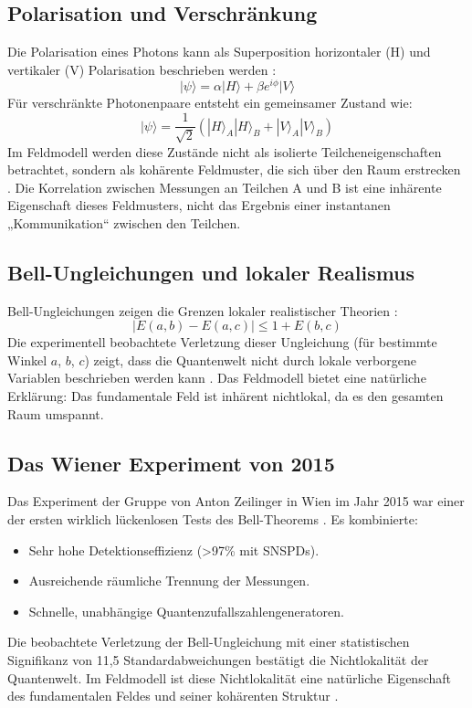 \documentclass[a4paper,12pt]{article}
\begin{document}
	\subsection{Polarisation und Verschränkung}
	Die Polarisation eines Photons kann als Superposition horizontaler (H) und vertikaler (V) Polarisation beschrieben werden \cite{Fox2006}:
	\begin{equation}
		|\psi\rangle = \alpha |H\rangle + \beta e^{i\phi} |V\rangle
	\end{equation}
	Für verschränkte Photonenpaare entsteht ein gemeinsamer Zustand wie:
	\begin{equation}
		|\psi\rangle = \frac{1}{\sqrt{2}} (|H\rangle_A |H\rangle_B + |V\rangle_A |V\rangle_B)
	\end{equation}
	Im Feldmodell werden diese Zustände nicht als isolierte Teilcheneigenschaften betrachtet, sondern als kohärente Feldmuster, die sich über den Raum erstrecken \cite{Zeilinger2010}. Die Korrelation zwischen Messungen an Teilchen A und B ist eine inhärente Eigenschaft dieses Feldmusters, nicht das Ergebnis einer instantanen „Kommunikation“ zwischen den Teilchen.
	
	\subsection{Bell-Ungleichungen und lokaler Realismus}
	Bell-Ungleichungen zeigen die Grenzen lokaler realistischer Theorien \cite{Bell1964}:
	\begin{equation}
		|E(a,b) - E(a,c)| \leq 1 + E(b,c)
	\end{equation}
	Die experimentell beobachtete Verletzung dieser Ungleichung (für bestimmte Winkel \( a \), \( b \), \( c \)) zeigt, dass die Quantenwelt nicht durch lokale verborgene Variablen beschrieben werden kann \cite{Aspect1982}. Das Feldmodell bietet eine natürliche Erklärung: Das fundamentale Feld ist inhärent nichtlokal, da es den gesamten Raum umspannt.
	
	\subsection{Das Wiener Experiment von 2015}
	Das Experiment der Gruppe von Anton Zeilinger in Wien im Jahr 2015 war einer der ersten wirklich lückenlosen Tests des Bell-Theorems \cite{Giustina2015}. Es kombinierte:
	\begin{itemize}
		\item Sehr hohe Detektionseffizienz (>97\% mit SNSPDs).
		\item Ausreichende räumliche Trennung der Messungen.
		\item Schnelle, unabhängige Quantenzufallszahlengeneratoren.
	\end{itemize}
	Die beobachtete Verletzung der Bell-Ungleichung mit einer statistischen Signifikanz von 11,5 Standardabweichungen bestätigt die Nichtlokalität der Quantenwelt. Im Feldmodell ist diese Nichtlokalität eine natürliche Eigenschaft des fundamentalen Feldes und seiner kohärenten Struktur \cite{Zeilinger2010}.
	
\end{document}
